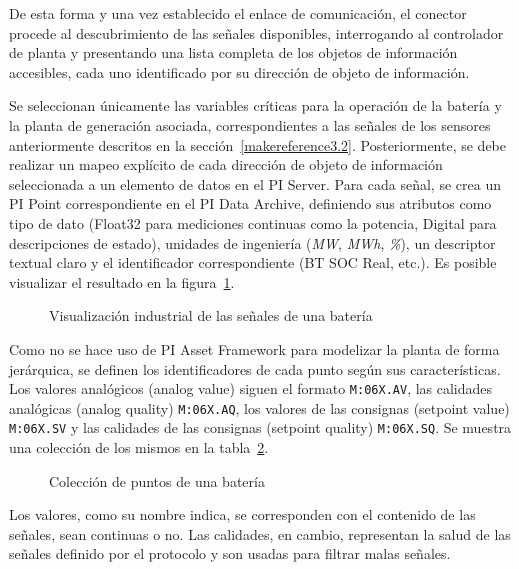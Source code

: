 De esta forma y una vez establecido el enlace de comunicación, el conector procede al descubrimiento de las señales disponibles, interrogando al controlador de planta y presentando una lista completa de los objetos de información accesibles, cada uno identificado por su dirección de objeto de información.

Se seleccionan únicamente las variables críticas para la operación de la batería y la planta de generación asociada, correspondientes a las señales de los sensores anteriormente descritos en la sección~\ref{makereference3.2}. Posteriormente, se debe realizar un mapeo explícito de cada dirección de objeto de información seleccionada a un elemento de datos en el PI Server. Para cada señal, se crea un PI Point correspondiente en el PI Data Archive, definiendo sus atributos como tipo de dato (Float32 para mediciones continuas como la potencia, Digital para descripciones de estado), unidades de ingeniería (\textit{MW}, \textit{MWh}, \textit{\%}), un descriptor textual claro y el identificador correspondiente (BT SOC Real, etc.). Es posible visualizar el resultado en la figura~\ref{fig:visualización-industrial-de-batería}.

\begin{figure}
\centering
\caption{Visualización industrial de las señales de una batería}
\label{fig:visualización-industrial-de-batería}
\end{figure}

Como no se hace uso de PI Asset Framework para modelizar la planta de forma jerárquica, se definen los identificadores de cada punto según sus características. Los valores analógicos (analog value) siguen el formato \texttt{M:06X.AV}, las calidades analógicas (analog quality) \texttt{M:06X.AQ}, los valores de las consignas (setpoint value) \texttt{M:06X.SV} y las calidades de las consignas (setpoint quality) \texttt{M:06X.SQ}. Se muestra una colección de los mismos en la tabla~\ref{fig:puntos-batería}.

\begin{figure}
\centering
\caption{Colección de puntos de una batería}
\label{fig:puntos-batería}
\end{figure}

Los valores, como su nombre indica, se corresponden con el contenido de las señales, sean continuas o no. Las calidades, en cambio, representan la salud de las señales definido por el protocolo y son usadas para filtrar malas señales.

